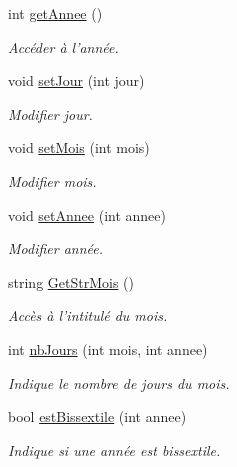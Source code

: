 \begin{DoxyCompactItemize}
int \hyperlink{class_c_date_af37b56e430b856c1b2360cfc7c284bf0}{getAnnee} ()
\begin{DoxyCompactList}\small\item\em Accéder à l'année. \item\end{DoxyCompactList}\item 
void \hyperlink{class_c_date_a9ba9c1985bd904ae24b8d10d580c9dfa}{setJour} (int jour)
\begin{DoxyCompactList}\small\item\em Modifier jour. \item\end{DoxyCompactList}\item 
void \hyperlink{class_c_date_a1d8d023913f19ee53edb9857b5cec7e5}{setMois} (int mois)
\begin{DoxyCompactList}\small\item\em Modifier mois. \item\end{DoxyCompactList}\item 
void \hyperlink{class_c_date_a3340b3febf97ddad564a26784cd739da}{setAnnee} (int annee)
\begin{DoxyCompactList}\small\item\em Modifier année. \item\end{DoxyCompactList}\item 
string \hyperlink{class_c_date_a4182c878d46bd44c8a78c82cccc504da}{GetStrMois} ()
\begin{DoxyCompactList}\small\item\em Accès à l'intitulé du mois. \item\end{DoxyCompactList}\item 
int \hyperlink{class_c_date_a04a7801cc2f9441321735bf41602d3b2}{nbJours} (int mois, int annee)
\begin{DoxyCompactList}\small\item\em Indique le nombre de jours du mois. \item\end{DoxyCompactList}\item 
bool \hyperlink{class_c_date_a02dad71347f444a5ee5a889f62fb5f4e}{estBissextile} (int annee)
\begin{DoxyCompactList}\small\item\em Indique si une année est bissextile. \item\end{DoxyCompactList}\item 

\end{DoxyCompactItemize}
